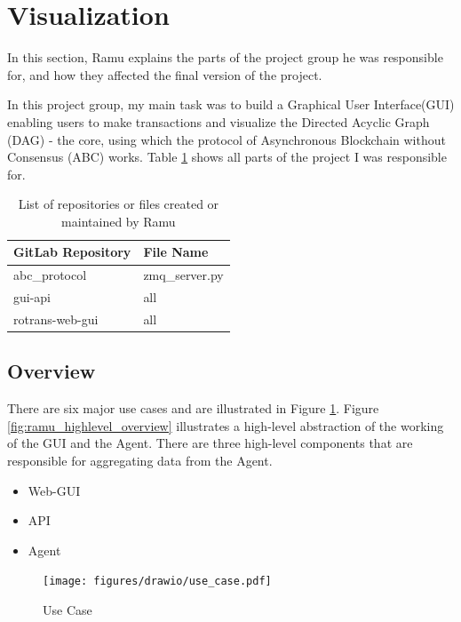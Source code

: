 \usetikzlibrary{shapes}
\newcommand*\circled[1]{\tikz[baseline=(char.base)]{
            \node[shape=circle,draw,inner sep=2pt] (char) {#1};}}

\section{Visualization}
In this section, Ramu explains the parts of the project group he was responsible for, and how they affected the final version of the project. 

In this project group, my main task was to build a Graphical User Interface(GUI) enabling users to make transactions and visualize the Directed Acyclic Graph (DAG) - the core, using which the protocol of Asynchronous Blockchain without Consensus (ABC) works.  Table \ref{tab:ramu_resp_code} shows all parts of the project I was responsible for.


\begin{table}[htbp]
	\centering
	\begin{tabular}{ll}
		\hline
		\textbf{GitLab Repository} & \textbf{File Name} \bigstrut\\
		\hline
		abc\_protocol & zmq\_server.py \bigstrut[t]\\
		\hline
		gui-api & all \\
		\hline
        rotrans-web-gui & all \\
		\hline
	\end{tabular}%
	\caption{List of repositories or files created or maintained by Ramu}
	\label{tab:ramu_resp_code}%
\end{table}%

\subsection{Overview}
There are six major use cases and are illustrated in Figure \ref{fig:use_case}. Figure \ref{fig:ramu_highlevel_overview} illustrates a high-level abstraction of the working of the GUI and the Agent. There are three high-level components that are responsible for aggregating data from the Agent.

\begin{itemize}
	\item Web-GUI  
	\item API 
	\item Agent
\end{itemize}

\begin{figure}[htbp]
	\centering
	\texttt{[image: figures/drawio/use\_case.pdf]}
	\caption{Use Case}
	\label{fig:use_case}
\end{figure}


